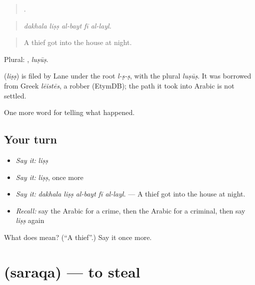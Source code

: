 \begin{quote}
    .
\end{quote}

\begin{quote}
\emph{dakhala liṣṣ al-bayt fī al-layl.}
\end{quote}

\begin{quote}
A thief got into the house at night.
\end{quote}

Plural: , \emph{luṣūṣ}.

\begin{cousinweb}
\textbf{} (\emph{liṣṣ}) is filed by Lane under the root \emph{l-ṣ-ṣ}, with the plural \emph{luṣūṣ}. It was borrowed from Greek \emph{lēistēs}, a robber (EtymDB); the path it took into Arabic is not settled.
\end{cousinweb}

\begin{grammarlens}[title={What you've built}]
One more word for telling what happened.
\end{grammarlens}

\subsection*{Your turn}
\begin{itemize}
\raggedright
  \item \emph{Say it:} \emph{liṣṣ}
  \item \emph{Say it:} \emph{liṣṣ}, once more
  \item \emph{Say it:} \emph{dakhala liṣṣ al-bayt fī al-layl.} — A thief got into the house at night.
  \item \emph{Recall:} say the Arabic for a crime, then the Arabic for a criminal, then say \emph{liṣṣ} again
\end{itemize}

\begin{tcolorbox}[breakable,colback=teal!4,colframe=teal!35!black,title={Before you move on}]
What does  mean? (\textquotedblleft{}A thief\textquotedblright{}.) Say it once more.
\end{tcolorbox}
\section[\texorpdfstring{\ar{سرق} (saraqa)}{سرق (saraqa)}]{ (saraqa) — to steal}

